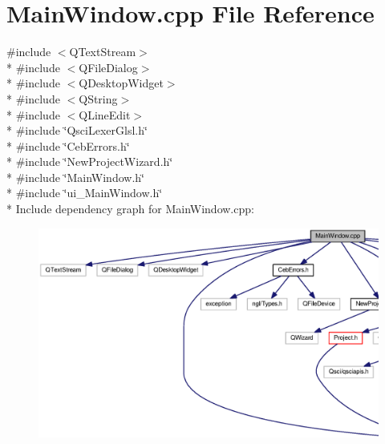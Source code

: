 \section{Main\-Window.\-cpp File Reference}
\label{_main_window_8cpp}
{\ttfamily \#include $<$Q\-Text\-Stream$>$}\\*
{\ttfamily \#include $<$Q\-File\-Dialog$>$}\\*
{\ttfamily \#include $<$Q\-Desktop\-Widget$>$}\\*
{\ttfamily \#include $<$Q\-String$>$}\\*
{\ttfamily \#include $<$Q\-Line\-Edit$>$}\\*
{\ttfamily \#include \char`\"{}Qsci\-Lexer\-Glsl.\-h\char`\"{}}\\*
{\ttfamily \#include \char`\"{}Ceb\-Errors.\-h\char`\"{}}\\*
{\ttfamily \#include \char`\"{}New\-Project\-Wizard.\-h\char`\"{}}\\*
{\ttfamily \#include \char`\"{}Main\-Window.\-h\char`\"{}}\\*
{\ttfamily \#include \char`\"{}ui\-\_\-\-Main\-Window.\-h\char`\"{}}\\*
Include dependency graph for Main\-Window.\-cpp\-:\nopagebreak
\begin{figure}[H]
\begin{center}
\leavevmode
\includegraphics[width=350pt]{_main_window_8cpp__incl}
\end{center}
\end{figure}
